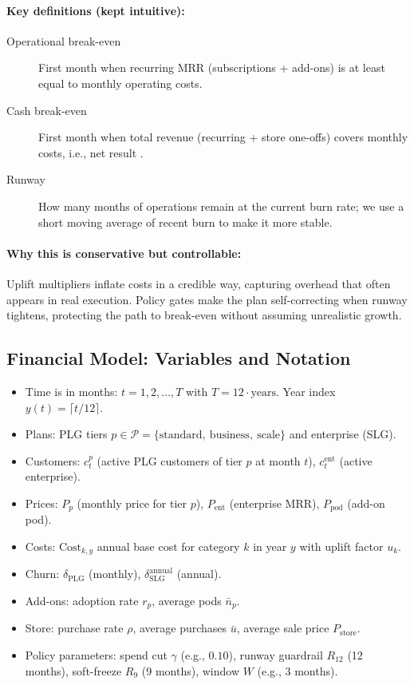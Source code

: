 \documentclass[11pt, a4paper, oneside]{article}
\begin{document}
\paragraph{Key definitions (kept intuitive):}
\begin{description}
\item[Operational break-even] First month when recurring MRR (subscriptions + add-ons) is at least equal to monthly operating costs.
\item[Cash break-even] First month when total revenue (recurring + store one-offs) covers mon\-th\-ly costs, i.e., net result .
\item[Runway] How many months of operations remain at the current burn rate; we use a short moving average of recent burn to make it more stable.
\end{description}

\paragraph{Why this is conservative but controllable:}
Uplift multipliers inflate costs in a credible way, capturing overhead that often appears in real execution. Policy gates make the plan self-correcting when runway tightens, protecting the path to break-even without assuming unrealistic growth.

\subsection{Financial Model: Variables and Notation}
\begin{itemize}
  \item Time is in months: $t = 1,2,\dots,T$ with $T = 12 \cdot \text{years}$. Year index $y(t) = \lceil t/12 \rceil$.
  \item Plans: PLG tiers $p \in \mathcal{P}=\{\text{standard},\ \text{business},\ \text{scale}\}$ and enterprise (SLG).
  \item Customers: $c^p_t$ (active PLG customers of tier $p$ at month $t$), $c^{\mathrm{ent}}_t$ (active enterprise).
  \item Prices: $P_p$ (monthly price for tier $p$), $P_{\mathrm{ent}}$ (enterprise MRR), $P_{\mathrm{pod}}$ (add-on pod).
  \item Costs: $\mathrm{Cost}_{k,y}$ annual base cost for category $k$ in year $y$ with uplift factor $u_k$.
  \item Churn: $\delta_{\mathrm{PLG}}$ (monthly), $\delta^{\mathrm{annual}}_{\mathrm{SLG}}$ (annual). 
  \item Add-ons: adoption rate $r_p$, average pods $\bar{n}_p$.
  \item Store: purchase rate $\rho$, average purchases $\bar{u}$, average sale price $P_{\mathrm{store}}$.
  \item Policy parameters: spend cut $\gamma$ (e.g., $0.10$), runway guardrail $R_{12}$ (12 months), soft-freeze $R_{9}$ (9 months), window $W$ (e.g., $3$ months).
\end{itemize}
\end{document}
